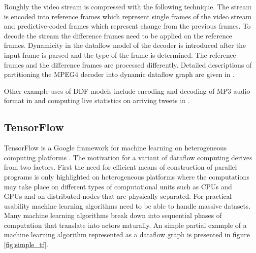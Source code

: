 \documentclass[conference,a4paper]{IEEEtran}
\begin{document}
Roughly the video stream is compressed with the following technique. The stream
is encoded into reference frames which represent single frames of the video
stream and predictive-coded frames which represent change from the previous
frames. To decode the stream the difference frames need to be applied on the
reference frames. Dynamicity in the dataflow model of the decoder is introduced
after the input frame is parsed and the type of the frame is determined. The
reference frames and the difference frames are processed differently. Detailed
descriptions of partitioning the MPEG4 decoder into dynamic dataflow graph are
given in \cite{eker2003cal, roquier2008automatic}.

Other example uses of DDF models include encoding and decoding of MP3 audio
format in \cite{bhattacharyya2013handbook} and computing live statistics on
arriving tweets in \cite{murray2013naiad}.

\subsection{TensorFlow}
TensorFlow is a Google framework for machine learning on heterogeneous computing
platforms \cite{tensorflow2015-whitepaper}. The motivation for a variant of
dataflow computing derives from two factors. First the need for efficient means of
construction of parallel programs is only highlighted on heterogeneous platforms
where the computations may take place on different types of computational units
such as CPUs and GPUs and on distributed nodes that are physically separated.
For practical usability machine learning algorithms need to be able to handle
massive datasets. Many machine learning algorithms break down into sequential
phases of computation that translate into actors naturally. An simple partial
example of a machine learning algorithm represented as a dataflow graph is
presented in figure \ref{fig:simple_tf}.
\end{document}
